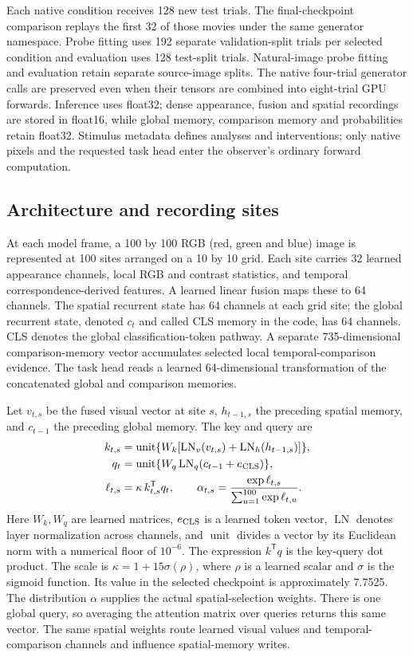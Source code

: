\documentclass[11pt]{article}
\begin{document}
Each native condition receives 128 new test trials. The final-checkpoint comparison replays the first 32 of those movies under the same generator namespace. Probe fitting uses 192 separate validation-split trials per selected condition and evaluation uses 128 test-split trials. Natural-image probe fitting and evaluation retain separate source-image splits. The native four-trial generator calls are preserved even when their tensors are combined into eight-trial GPU forwards. Inference uses float32; dense appearance, fusion and spatial recordings are stored in float16, while global memory, comparison memory and probabilities retain float32. Stimulus metadata defines analyses and interventions; only native pixels and the requested task head enter the observer's ordinary forward computation.

\subsection{Architecture and recording sites}
At each model frame, a 100 by 100 RGB (red, green and blue) image is represented at 100 sites arranged on a 10 by 10 grid. Each site carries 32 learned appearance channels, local RGB and contrast statistics, and temporal correspondence-derived features. A learned linear fusion maps these to 64 channels. The spatial recurrent state has 64 channels at each grid site; the global recurrent state, denoted $c_t$ and called CLS memory in the code, has 64 channels. CLS denotes the global classification-token pathway. A separate 735-dimensional comparison-memory vector accumulates selected local temporal-comparison evidence. The task head reads a learned 64-dimensional transformation of the concatenated global and comparison memories.

Let $v_{t,s}$ be the fused visual vector at site $s$, $h_{t-1,s}$ the preceding spatial memory, and $c_{t-1}$ the preceding global memory. The key and query are
\begin{align}
 k_{t,s}&=\operatorname{unit}\{W_k[\operatorname{LN}_v(v_{t,s})+\operatorname{LN}_h(h_{t-1,s})]\},\\
 q_t&=\operatorname{unit}\{W_q\operatorname{LN}_q(c_{t-1}+e_{\rm CLS})\},\\
 \ell_{t,s}&=\kappa\,k_{t,s}^{\mathsf T}q_t,\qquad
 \alpha_{t,s}=\frac{\exp\ell_{t,s}}{\sum_{u=1}^{100}\exp\ell_{t,u}}.
\end{align}
Here $W_k,W_q$ are learned matrices, $e_{\rm CLS}$ is a learned token vector, $\operatorname{LN}$ denotes layer normalization across channels, and $\operatorname{unit}$ divides a vector by its Euclidean norm with a numerical floor of $10^{-6}$. The expression $k^{\mathsf T}q$ is the key-query dot product. The scale is $\kappa=1+15\sigma(\rho)$, where $\rho$ is a learned scalar and $\sigma$ is the sigmoid function. Its value in the selected checkpoint is approximately 7.7525. The distribution $\alpha$ supplies the actual spatial-selection weights. There is one global query, so averaging the attention matrix over queries returns this same vector. The same spatial weights route learned visual values and temporal-comparison channels and influence spatial-memory writes.
\end{document}
